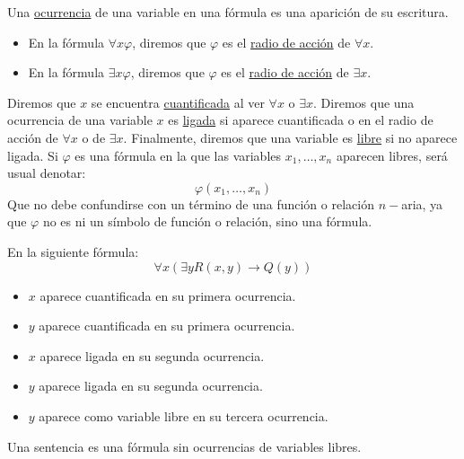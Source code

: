 \begin{definicion}
    Una \underline{ocurrencia} de una variable en una fórmula es una aparición de su escritura.
    \begin{itemize}
        \item En la fórmula $\forall x\varphi$, diremos que $\varphi$ es el \underline{radio de acción} de $\forall x$.
        \item En la fórmula $\exists x\varphi$, diremos que $\varphi$ es el \underline{radio de acción} de $\exists x$.
    \end{itemize}
    Diremos que $x$ se encuentra \underline{cuantificada} al ver $\forall x$ o $\exists x$.\newline
    Diremos que una ocurrencia de una variable $x$ es \underline{ligada} si aparece cuantificada o en el radio de acción de $\forall x$ o de $\exists x$.\newline
    Finalmente, diremos que una variable es \underline{libre} si no aparece ligada. Si $\varphi$ es una fórmula en la que las variables $x_1,\ldots,x_n$ aparecen libres, será usual denotar:
    \begin{equation*}
        \varphi(x_1,\ldots,x_n)
    \end{equation*}
    Que no debe confundirse con un término de una función o relación $n-$aria, ya que $\varphi$ no es ni un símbolo de función o relación, sino una fórmula.
\end{definicion}

\begin{ejemplo}
    En la siguiente fórmula:
    \begin{equation*}
        \forall x(\exists yR(x,y)\to Q(y))
    \end{equation*}
    \begin{itemize}
        \item $x$ aparece cuantificada en su primera ocurrencia.
        \item $y$ aparece cuantificada en su primera ocurrencia.
        \item $x$ aparece ligada en su segunda ocurrencia.
        \item $y$ aparece ligada en su segunda ocurrencia.
        \item $y$ aparece como variable libre en su tercera ocurrencia.
    \end{itemize}
\end{ejemplo}

\begin{definicion}[Sentencia]
    Una sentencia es una fórmula sin ocurrencias de variables libres.
\end{definicion}

